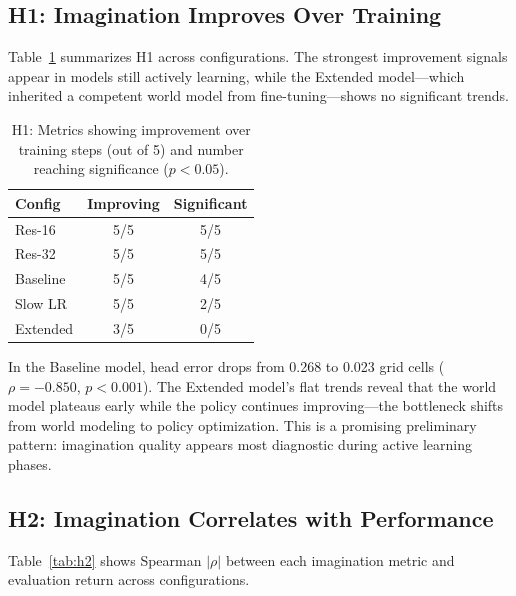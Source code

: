 \documentclass[letterpaper]{article}
\begin{document}
\subsection{H1: Imagination Improves Over Training}

Table~\ref{tab:h1} summarizes H1 across configurations. The strongest improvement signals appear in models still actively learning, while the Extended model---which inherited a competent world model from fine-tuning---shows no significant trends.

\begin{table}[h]
\centering
\small
\begin{tabular}{lcc}
\toprule
\textbf{Config} & \textbf{Improving} & \textbf{Significant} \\
\midrule
Res-16      & 5/5 & 5/5 \\
Res-32      & 5/5 & 5/5 \\
Baseline    & 5/5 & 4/5 \\
Slow LR     & 5/5 & 2/5 \\
Extended    & 3/5 & 0/5 \\
\bottomrule
\end{tabular}
\caption{H1: Metrics showing improvement over training steps (out of 5) and number reaching significance ($p < 0.05$).}
\label{tab:h1}
\end{table}

In the Baseline model, head error drops from 0.268 to 0.023 grid cells ($\rho = -0.850$, $p < 0.001$). The Extended model's flat trends reveal that the world model plateaus early while the policy continues improving---the bottleneck shifts from world modeling to policy optimization. This is a promising preliminary pattern: imagination quality appears most diagnostic during active learning phases.

\subsection{H2: Imagination Correlates with Performance}

Table~\ref{tab:h2} shows Spearman $|\rho|$ between each imagination metric and evaluation return across configurations.
\end{document}
